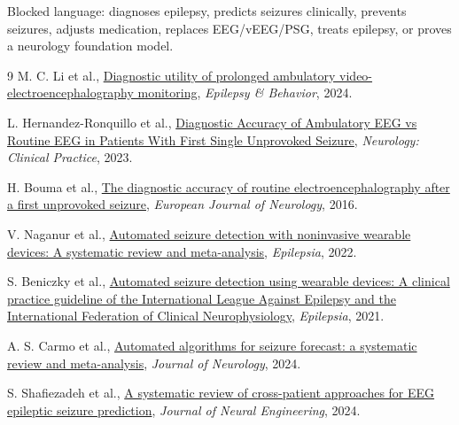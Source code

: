\documentclass[10pt]{article}
\begin{document}
Blocked language: diagnoses epilepsy, predicts seizures clinically, prevents seizures, adjusts medication, replaces EEG/vEEG/PSG, treats epilepsy, or proves a neurology foundation model.

\begin{thebibliography}{9}
M. C. Li et al.,
\href{https://consensus.app/papers/details/9ca353f770245b4d82aacc65aae8e37b/?utm_source=unknown}{Diagnostic utility of prolonged ambulatory video-electroencephalography monitoring},
\emph{Epilepsy \& Behavior}, 2024.

L. Hernandez-Ronquillo et al.,
\href{https://consensus.app/papers/details/3eb9fac24173596da8c7ae3d6d60e879/?utm_source=unknown}{Diagnostic Accuracy of Ambulatory EEG vs Routine EEG in Patients With First Single Unprovoked Seizure},
\emph{Neurology: Clinical Practice}, 2023.

H. Bouma et al.,
\href{https://consensus.app/papers/details/e93de1b6e0755abe8176fef442024c32/?utm_source=unknown}{The diagnostic accuracy of routine electroencephalography after a first unprovoked seizure},
\emph{European Journal of Neurology}, 2016.

V. Naganur et al.,
\href{https://consensus.app/papers/details/88c1d0d7ea71587e9248a9cc3d9a5041/?utm_source=unknown}{Automated seizure detection with noninvasive wearable devices: A systematic review and meta-analysis},
\emph{Epilepsia}, 2022.

S. Beniczky et al.,
\href{https://consensus.app/papers/details/f4e568f079ca50a9b96a4d0313e3f410/?utm_source=unknown}{Automated seizure detection using wearable devices: A clinical practice guideline of the International League Against Epilepsy and the International Federation of Clinical Neurophysiology},
\emph{Epilepsia}, 2021.

A. S. Carmo et al.,
\href{https://consensus.app/papers/details/bd024f0e465d5f1e9b70ded08334df4b/?utm_source=unknown}{Automated algorithms for seizure forecast: a systematic review and meta-analysis},
\emph{Journal of Neurology}, 2024.

S. Shafiezadeh et al.,
\href{https://consensus.app/papers/details/9a161ced16705127bce6b5fd257f33ce/?utm_source=unknown}{A systematic review of cross-patient approaches for EEG epileptic seizure prediction},
\emph{Journal of Neural Engineering}, 2024.
\end{thebibliography}
\end{document}
